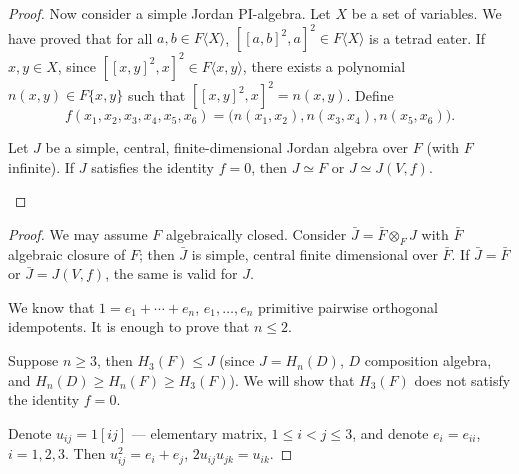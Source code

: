 \documentclass{article}
\begin{document}
\begin{proof}
Now consider a simple Jordan PI-algebra. Let $X$ be a set of variables. We have proved that for all $a,b\in F\langle X\rangle$, $[[a,b]^2,a]^2\in F\langle X\rangle$ is a tetrad eater. If $x,y\in X$, since $[[x,y]^2,x]^2\in F\langle x,y\rangle$, there exists a polynomial $n(x,y)\in F\{x,y\}$ such that $[[x,y]^2,x]^2 = n(x,y)$. Define
\[
f(x_1,x_2,x_3,x_4,x_5,x_6) = \bigl(n(x_1,x_2), n(x_3,x_4), n(x_5,x_6)\bigr).
\]

\begin{lemma}
Let $J$ be a simple, central, finite-dimensional Jordan algebra over $F$ (with $F$ infinite). If $J$ satisfies the identity $f=0$, then $J\simeq F$ or $J\simeq J(V,f)$.
\end{lemma}
\end{proof}

\begin{proof}
We may assume $F$ algebraically closed.
Consider $\bar{J}=\bar{F}\otimes_F J$ with $\bar{F}$ algebraic closure of $F$; then $\bar{J}$ is simple, central finite dimensional over $\bar{F}$. If $\bar{J}=\bar{F}$ or $\bar{J}=J(V,f)$, the same is valid for $J$.

We know that $1=e_1+\cdots+e_n$, $e_1,\dots,e_n$ primitive pairwise orthogonal idempotents. It is enough to prove that $n\leq 2$.

Suppose $n\geq 3$, then $H_3(F)\leq J$ (since $J=H_n(D)$, $D$ composition algebra, and $H_n(D)\geq H_n(F)\geq H_3(F)$). We will show that $H_3(F)$ does not satisfy the identity $f=0$.

Denote $u_{ij}=1[i j]$ --- elementary matrix, $1\leq i<j\leq 3$, and denote $e_i=e_{ii}$, $i=1,2,3$. Then $u_{ij}^2=e_i+e_j$, $2u_{ij}u_{jk}=u_{ik}$.


\end{proof}
\end{document}
